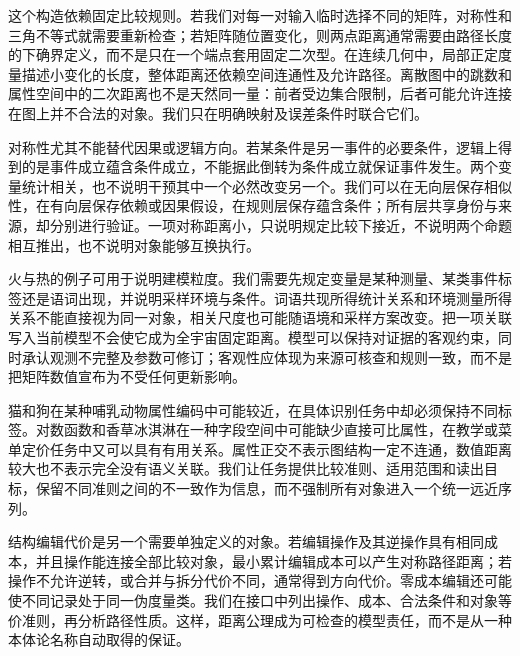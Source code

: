 这个构造依赖固定比较规则。若我们对每一对输入临时选择不同的矩阵，对称性和三角不等式就需要重新检查；若矩阵随位置变化，则两点距离通常需要由路径长度的下确界定义，而不是只在一个端点套用固定二次型。在连续几何中，局部正定度量描述小变化的长度，整体距离还依赖空间连通性及允许路径。离散图中的跳数和属性空间中的二次距离也不是天然同一量：前者受边集合限制，后者可能允许连接在图上并不合法的对象。我们只在明确映射及误差条件时联合它们。

对称性尤其不能替代因果或逻辑方向。若某条件是另一事件的必要条件，逻辑上得到的是事件成立蕴含条件成立，不能据此倒转为条件成立就保证事件发生。两个变量统计相关，也不说明干预其中一个必然改变另一个。我们可以在无向层保存相似性，在有向层保存依赖或因果假设，在规则层保存蕴含条件；所有层共享身份与来源，却分别进行验证。一项对称距离小，只说明规定比较下接近，不说明两个命题相互推出，也不说明对象能够互换执行。

火与热的例子可用于说明建模粒度。我们需要先规定变量是某种测量、某类事件标签还是语词出现，并说明采样环境与条件。词语共现所得统计关系和环境测量所得关系不能直接视为同一对象，相关尺度也可能随语境和采样方案改变。把一项关联写入当前模型不会使它成为全宇宙固定距离。模型可以保持对证据的客观约束，同时承认观测不完整及参数可修订；客观性应体现为来源可核查和规则一致，而不是把矩阵数值宣布为不受任何更新影响。

猫和狗在某种哺乳动物属性编码中可能较近，在具体识别任务中却必须保持不同标签。对数函数和香草冰淇淋在一种字段空间中可能缺少直接可比属性，在教学或菜单定价任务中又可以具有有用关系。属性正交不表示图结构一定不连通，数值距离较大也不表示完全没有语义关联。我们让任务提供比较准则、适用范围和读出目标，保留不同准则之间的不一致作为信息，而不强制所有对象进入一个统一远近序列。

结构编辑代价是另一个需要单独定义的对象。若编辑操作及其逆操作具有相同成本，并且操作能连接全部比较对象，最小累计编辑成本可以产生对称路径距离；若操作不允许逆转，或合并与拆分代价不同，通常得到方向代价。零成本编辑还可能使不同记录处于同一伪度量类。我们在接口中列出操作、成本、合法条件和对象等价准则，再分析路径性质。这样，距离公理成为可检查的模型责任，而不是从一种本体论名称自动取得的保证。
